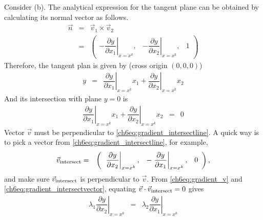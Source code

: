 Consider (b). The analytical expression for the tangent plane can be obtained by calculating its normal vector as follows.
\begin{eqnarray}
  \vec{n} &=& \vec{v}_1 \times \vec{v}_2 \nonumber \\
  &=& \left(\begin{array}{ccc}
              -\left.\dfrac{\partial y}{\partial x_1}\right|_{x=x^k}, & -\left.\dfrac{\partial y}{\partial x_2}\right|_{x=x^k}, & 1
            \end{array}\right) \nonumber
\end{eqnarray}
Therefore, the tangent plan is given by (cross origin $(0,0,0)$)
\begin{eqnarray}
  y &=& \left.\dfrac{\partial y}{\partial x_1}\right|_{x=x^k} x_1 + \left.\dfrac{\partial y}{\partial x_2}\right|_{x=x^k} x_2 \nonumber
\end{eqnarray}
And its intersection with plane $y=0$ is
\begin{eqnarray}
  \left.\dfrac{\partial y}{\partial x_1}\right|_{x=x^k} x_1 + \left.\dfrac{\partial y}{\partial x_2}\right|_{x=x^k} x_2 &=& 0 \label{ch6eq:gradient_intersectline}
\end{eqnarray}
Vector $\vec{v}$ must be perpendicular to \eqref{ch6eq:gradient_intersectline}. A quick way is to pick a vector from \eqref{ch6eq:gradient_intersectline}, for example,
\begin{eqnarray}
   \vec{v}_{\textup{intersect}} &=& \left(\begin{array}{ccc}
              \left.\dfrac{\partial y}{\partial x_2}\right|_{x=x^k}, & -\left.\dfrac{\partial y}{\partial x_1}\right|_{x=x^k}, & 0
            \end{array}\right), \label{ch6eq:gradient_intersectvector}
\end{eqnarray}
and make sure $\vec{v}_{\textup{intersect}}$ is perpendicular to $\vec{v}$. From \eqref{ch6eq:gradient_v} and \eqref{ch6eq:gradient_intersectvector}, equating $\vec{v} \cdot \vec{v}_{\textup{intersect}} = 0$ gives
\begin{eqnarray}
  \lambda_1 \left.\dfrac{\partial y}{\partial x_2}\right|_{x=x^k} &=& \lambda_2 \left.\dfrac{\partial y}{\partial x_1}\right|_{x=x^k} \label{ch6eq:gradient_lambdarestrict}
\end{eqnarray}

